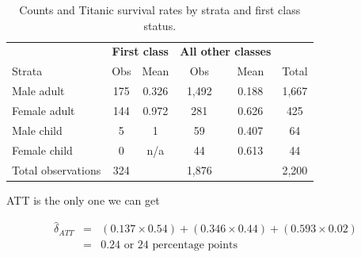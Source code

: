 \documentclass{beamer}
\begin{document}
\begin{frame}

\begin{table}\tiny{}
\caption{Counts and Titanic survival rates by strata and first class status.}
\centering
\begin{tabular}{lcc|cc|c}
\toprule
\multicolumn{1}{c}{\textbf{}}&
\multicolumn{2}{c}{\textbf{First class}}&
\multicolumn{2}{c}{\textbf{All other classes}}&
\multicolumn{1}{c}{\textbf{}}\\
\multicolumn{1}{l}{Strata}&
\multicolumn{1}{c}{Obs}&
\multicolumn{1}{c}{Mean}&
\multicolumn{1}{c}{Obs}&
\multicolumn{1}{c}{Mean}&
\multicolumn{1}{c}{Total}\\
\midrule
Male adult		& 175	& 0.326	& 1,492	& 0.188	& 1,667 \\
Female adult	& 144	& 0.972	& 281	& 0.626	& 425 \\
Male child		& 5		& 1		& 59		& 0.407 	& 64\\
Female child	& 0		& n/a		& 44		& 0.613 	& 44\\
\midrule
Total	observations	& 324	&&	1,876	 && 2,200\\
\bottomrule
\end{tabular}
\label{tab:titanic-counts2}
\end{table}

\end{frame}

\begin{frame}{ATT is the only one we can get}

\begin{eqnarray}
\widehat{\delta}_{ATT} &=& (0.137 \times 0.54) + (0.346 \times 0.44) + (0.593 \times 0.02)  \nonumber \\
&=& 0.24\text{ or 24 percentage points}
\end{eqnarray}

\end{frame}
\end{document}
